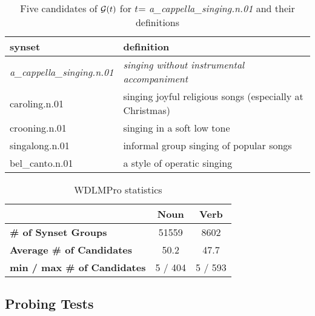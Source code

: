 \documentclass[11pt,a4paper]{article}
\begin{document}
\begin{table*}
    \centering
    \begin{tabular}{l|l}
    \hline
    \textbf{synset} & \textbf{definition} \\ \hline
    \emph{a\_cappella\_singing.n.01} & \emph{singing without instrumental accompaniment} \\
     caroling.n.01 & singing joyful religious songs (especially at Christmas) \\
     crooning.n.01 & singing in a soft low tone \\
     singalong.n.01 & informal group singing of popular songs \\
     bel\_canto.n.01 & a style of operatic singing \\ \hline
   
    \end{tabular}
    \caption{Five candidates of ${\cal G}(t)$ for $t$=  \emph{a\_cappella\_singing.n.01} and their definitions} 
    \label{tab:dataset_samples}
\end{table*}


\begin{table}
    \centering
    \begin{tabular}{l|cc}
    \hline
         & \textbf{Noun} & \textbf{Verb} \\ \hline
         \textbf{\# of Synset Groups} & 51559 & 8602 \\
         \textbf{Average \# of Candidates} & 50.2 & 47.7 \\
         \textbf{min / max \# of Candidates} & 5 / 404 & 5 / 593 \\ \hline
    \end{tabular}
    \caption{WDLMPro statistics}
    \label{tab:dataset_stats}
\end{table}

\subsection{Probing Tests}
\end{document}
